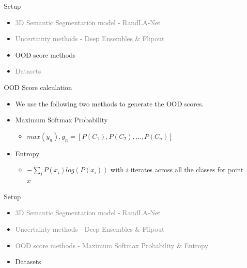 \documentclass[aspectratio=169]{beamer}
\begin{document}
\begin{frame}[noframenumbering]{Setup}
    \begin{itemize}
        
        \item \textcolor{gray}{3D Semantic Segmentation model - RandLA-Net}
        \item \textcolor{gray}{Uncertainty methods - Deep Ensembles \& Flipout}
        \item OOD score methods
        \item \textcolor{gray}{Datasets}
    \end{itemize}
\end{frame}
\begin{frame}{OOD Score calculation}
    \begin{itemize}
        \item We use the following two methods to generate the OOD scores.
        \item Maximum Softmax Probability
        \begin{itemize}
            \item $max(y_n), y_n = [P(C_1), P(C_2), ..., P(C_n)]$
        \end{itemize}
        \item Entropy
        \begin{itemize}
            \item $-\sum_i P(x_i)log(P(x_i))$ with $i$ iterates across all the classes for point $x$
        \end{itemize}
    \end{itemize}
\end{frame}
\begin{frame}[noframenumbering]{Setup}
    \begin{itemize}
        \item \textcolor{gray}{3D Semantic Segmentation model - RandLA-Net}
        \item \textcolor{gray}{Uncertainty methods - Deep Ensembles \& Flipout}
        \item \textcolor{gray}{OOD score methods - Maximum Softmax Probability \& Entropy}
        \item Datasets
    \end{itemize}
\end{frame}
\end{document}
